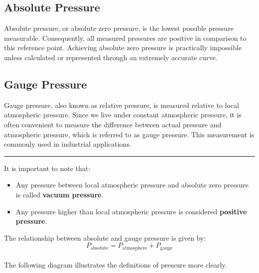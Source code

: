 \documentclass{article}
\begin{document}
	\subsection{Absolute Pressure}
	Absolute pressure, or absolute zero pressure, is the lowest possible pressure measurable. Consequently, all measured pressures are positive in comparison to this reference point. Achieving absolute zero pressure is practically impossible unless calculated or represented through an extremely accurate curve.
	\subsection{Gauge Pressure}
	Gauge pressure, also known as relative pressure, is measured relative to local atmospheric pressure. Since we live under constant atmospheric pressure, it is often convenient to measure the difference between actual pressure and atmospheric pressure, which is referred to as gauge pressure. This measurement is commonly used in industrial applications.\\[-0.2em]
	\hrule\vspace{0.8em}
	It is important to note that:\\[-5pt]
	\begin{itemize}
		\item Any pressure between local atmospheric pressure and absolute zero pressure is called \textbf{vacuum pressure}.
		\item Any pressure higher than local atmospheric pressure is considered \textbf{positive pressure}.
	\end{itemize}
	\vspace{0.7em}\noindent
	The relationship between absolute and gauge pressure is given by:\\[0.5em]
	\begin{equation}
		P_{\text{absolute}} = P_{\text{atmosphere}} + P_{\text{gauge}}
		\label{eq:absolute}
	\end{equation}\\
	\vspace{0.5em}
	The following diagram illustrates the definitions of pressure more clearly.	
\end{document}
